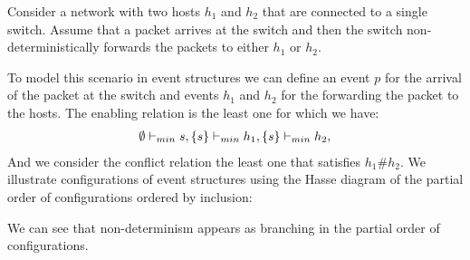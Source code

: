 \documentclass{article}
\begin{document}
\begin{example}
    Consider a network with two hosts $h_1$ and $h_2$ that are
    connected to a single switch.
    Assume that a packet arrives at the switch and then the switch
    non-deterministically forwards the packets to either $h_1$ or $h_2$.
    \begin{center}
    \end{center}
    To model this scenario in event structures we can define an event
    $p$ for the arrival of the packet at the switch and events $h_1$
    and $h_2$ for the forwarding the packet to the hosts.
    The enabling relation is the least one for which we have:
    \begin{align*}
        \emptyset \vdash_{min} s,
        \{s\} \vdash_{min} h_1,
        \{s\} \vdash_{min} h_2,
    \end{align*}
    And we consider the conflict relation the least one that satisfies
    $h_1 \# h_2$.
    We illustrate configurations of event structures using the Hasse diagram of
    the partial order of configurations ordered by inclusion:
    \begin{center}
    \end{center}
    We can see that non-determinism appears as branching in the partial order of configurations.
\end{example}
\end{document}
